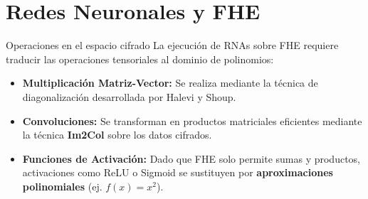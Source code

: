 \section{Redes Neuronales y FHE}

\begin{frame}{Operaciones en el espacio cifrado}
    La ejecución de RNAs sobre FHE requiere traducir las operaciones tensoriales al dominio de polinomios:
    \vspace{0.4cm}
    \begin{itemize}
        \setlength{\itemsep}{12pt}
        \item \textbf{Multiplicación Matriz-Vector:} Se realiza mediante la técnica de diagonalización desarrollada por Halevi y Shoup.
        \item \textbf{Convoluciones:} Se transforman en productos matriciales eficientes mediante la técnica \textbf{Im2Col} sobre los datos cifrados.
        \item \textbf{Funciones de Activación:} Dado que FHE solo permite sumas y productos, activaciones como ReLU o Sigmoid se sustituyen por \textbf{aproximaciones polinomiales} (ej. $f(x) = x^2$).
    \end{itemize}
\end{frame}

